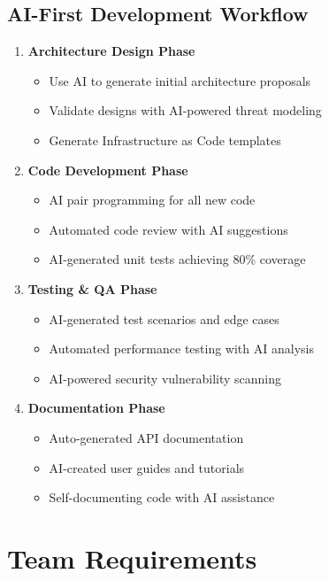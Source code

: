 \documentclass[12pt,a4paper]{report}
\begin{document}
\subsection{AI-First Development Workflow}
\begin{enumerate}
    \item \textbf{Architecture Design Phase}
    \begin{itemize}
        \item Use AI to generate initial architecture proposals
        \item Validate designs with AI-powered threat modeling
        \item Generate Infrastructure as Code templates
    \end{itemize}
    
    \item \textbf{Code Development Phase}
    \begin{itemize}
        \item AI pair programming for all new code
        \item Automated code review with AI suggestions
        \item AI-generated unit tests achieving 80\% coverage
    \end{itemize}
    
    \item \textbf{Testing \& QA Phase}
    \begin{itemize}
        \item AI-generated test scenarios and edge cases
        \item Automated performance testing with AI analysis
        \item AI-powered security vulnerability scanning
    \end{itemize}
    
    \item \textbf{Documentation Phase}
    \begin{itemize}
        \item Auto-generated API documentation
        \item AI-created user guides and tutorials
        \item Self-documenting code with AI assistance
    \end{itemize}
\end{enumerate}

\section{Team Requirements}
\end{document}

